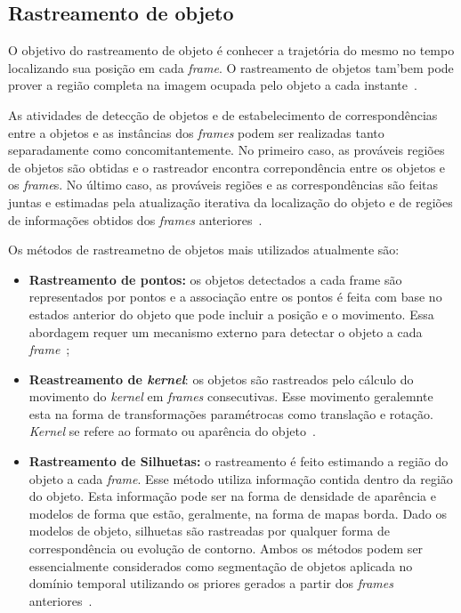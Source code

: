 \subsection{Rastreamento de objeto}

	O objetivo do rastreamento de objeto é conhecer a trajetória do mesmo no tempo localizando sua posição em cada \textit{frame}. O rastreamento de objetos tam'bem pode prover a região completa na imagem ocupada pelo objeto a cada instante~\cite{yilmaz}. 

	As atividades de detecção de objetos e de estabelecimento de correspondências entre a objetos e as instâncias dos \textit{frames} podem ser realizadas tanto separadamente como concomitantemente. No primeiro caso, as prováveis regiões de objetos são obtidas e o rastreador encontra correpondência entre os objetos e os \textit{frame}s. No último caso, as prováveis regiões e as correspondências são feitas juntas e estimadas pela atualização iterativa da localização do objeto e de regiões de informações obtidos dos \textit{frames} anteriores~\cite{yilmaz}.

	Os métodos de rastreametno de objetos mais utilizados atualmente são:

	\begin{itemize}
		\item \textbf{Rastreamento de pontos:} os objetos detectados a cada frame são representados por pontos e a associação entre os pontos é feita com base no estados anterior do objeto que pode incluir a posição e o movimento. Essa abordagem requer um mecanismo externo para detectar o objeto a cada \textit{frame}~\cite{yilmaz};

		\item \textbf{Reastreamento de \textit{kernel}}: os objetos são rastreados pelo cálculo do movimento do \textit{kernel} em \textit{frames} consecutivas. Esse movimento geralemnte esta na forma de transformações paramétrocas como translação e rotação. \textit{Kernel} se refere ao formato ou aparência do objeto~\cite{yilmaz}.

		\item \textbf{Rastreamento de Silhuetas:} o rastreamento é feito estimando a região do objeto a cada \textit{frame}. Esse método utiliza informação contida dentro da região do objeto. Esta informação pode ser na forma de densidade de aparência e modelos de forma que estão, geralmente, na forma de mapas borda. Dado os modelos de objeto, silhuetas são rastreadas por qualquer forma de correspondência ou evolução de contorno. Ambos os métodos podem ser essencialmente considerados como segmentação de objetos aplicada no domínio temporal utilizando os priores gerados a partir dos \textit{frames} anteriores~\cite{yilmaz}.
	\end{itemize}



